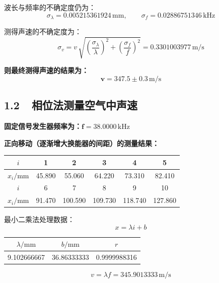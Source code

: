 \documentclass[a4paper,fontset=windows]{ctexart}
\begin{document}
    波长与频率的不确定度仍为：
    \[
    \sigma_{\lambda} = 0.005215361924\,\mathrm{mm},\qquad \sigma_f = 0.02886751346\,\mathrm{kHz}
    \]

    测得声速的不确定度为：
    \[
    \sigma_v = v \,\sqrt{\left(\frac{\sigma_{\lambda}}{\lambda}\right)^2 + \left(\frac{\sigma_f}{f}\right)^2} = 0.3301003977\,\mathrm{m/s}
    \]

    \textbf{则最终测得声速的结果为：}
    \[
    \boldsymbol{v = 347.5\pm0.3\,\mathrm{m/s}}
    \]

    \newpage
    \subsection*{ 1.2\ \ 相位法测量空气中声速}

    \textbf{固定信号发生器频率为：}$\boldsymbol{f = 38.0000\,\mathrm{kHz}}$

    \textbf{正向移动（逐渐增大换能器的间距）的测量结果：}

    \vspace{0.5em}\begin{table}[ht!]\Large
        \begin{center}
            \begin{tabular}{ |c|c|c|c|c|c| }
                \hline
                $i$ & 1 & 2 & 3 & 4 & 5 \\
                \hline
                $x_i/\mathrm{mm}$ & 45.890 & 55.060 & 64.220 & 73.310 & 82.410 \\
                \hline
                $i$ & 6 & 7 & 8 & 9 & 10 \\
                \hline
                $x_i/\mathrm{mm}$ & 91.470 & 100.590 & 109.730 & 118.740 & 127.860 \\
                \hline
            \end{tabular}
        \end{center}
    \end{table}\vspace{-0.5em}

    最小二乘法处理数据：
    \[
    x = \lambda i+b
    \]

    \begin{table}[ht!]\Large
        \begin{center}
            \begin{tabular}{ |c|c|c| }
                \hline
                $\lambda/\mathrm{mm}$ & $b/\mathrm{mm}$ & $r$ \\
                \hline
                9.102666667 & 36.86333333 & 0.9999988316 \\
                \hline
            \end{tabular}
        \end{center}
    \end{table}\vspace{-2em}
    \[
    v = \lambda f = 345.9013333\,\mathrm{m/s}
    \]
\end{document}
